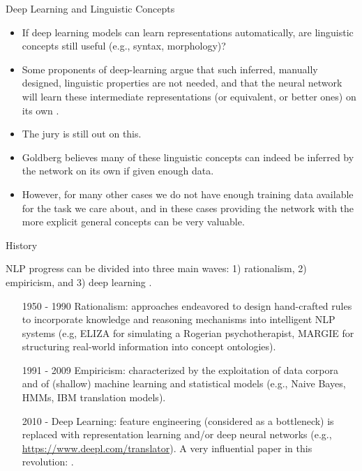 \documentclass[handout]{beamer}
\begin{document}
\begin{frame}{Deep Learning and Linguistic Concepts}
\begin{scriptsize}
\begin{itemize}
\item If deep learning models can learn representations automatically, are linguistic concepts still useful (e.g., syntax, morphology)?
\item Some proponents of deep-learning argue that such inferred, manually designed, linguistic properties are not needed, and that the neural network will learn
these intermediate representations (or equivalent, or better ones) on its own \cite{goldberg2016primer}. 
\item The jury is still out on this.
\item Goldberg believes many of these linguistic concepts can indeed be inferred by the network on its own if given enough data.
\item However, for many other cases we do not have enough training data available for the task we care about, and in these cases providing the network with the more explicit general concepts can be very valuable.
\end{itemize}
\end{scriptsize}
\end{frame}


\begin{frame}{History}
\begin{scriptsize}
NLP progress can be divided into three main waves: 1) rationalism, 2) empiricism, and 3) deep learning \cite{deng2018deep}.
\begin{itemize}
\item [1950 - 1990] Rationalism: approaches endeavored to design hand-crafted rules to incorporate knowledge and reasoning mechanisms into intelligent NLP systems (e.g,  ELIZA for simulating a Rogerian psychotherapist, MARGIE for structuring real-world information into concept ontologies).
\item [1991 - 2009] Empiricism: characterized by the exploitation of data corpora and
of (shallow) machine learning and statistical models (e.g., Naive Bayes, HMMs, IBM translation models).
\item [2010 - ] Deep Learning: feature engineering (considered as a bottleneck) is replaced with representation learning and/or deep neural networks (e.g., \url{https://www.deepl.com/translator}). A very influential paper in this revolution: \cite{collobert2011natural}.
\end{itemize}

\end{scriptsize}
\end{frame}
\end{document}
